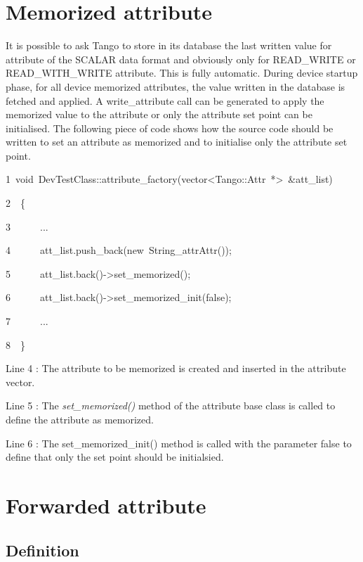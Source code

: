 \section{Memorized attribute}

It is possible to ask Tango to store in its database the last written
value for attribute of the SCALAR data format and obviously only for
READ\_WRITE or READ\_WITH\_WRITE attribute. This is fully automatic.
During device startup phase, for all device memorized
attributes, the value written in the database is fetched and applied.
A write\_attribute call can be generated to apply the memorized value
to the attribute or only the attribute set point can be initialised.
The following piece of code shows how the source code should be written
to set an attribute as memorized and to initialise only the attribute
set point.


\begin{lyxcode}
1~void~DevTestClass::attribute\_factory(vector<Tango::Attr~{*}>~\&att\_list)

2~~\{

3~~~~~~...

4~~~~~~att\_list.push\_back(new~String\_attrAttr());

5~~~~~~att\_list.back()->set\_memorized();

6~~~~~~att\_list.back()->set\_memorized\_init(false);

7~~~~~~...

8~~\}
\end{lyxcode}


Line 4 : The attribute to be memorized is created and inserted in
the attribute vector.

Line 5 : The \emph{set\_memorized()} method of the attribute base
class is called to define the attribute as memorized.

Line 6 : The set\_memorized\_init() method is called with the parameter
false to define that only the set point should be initialsied.


\section{Forwarded attribute}


\subsection{Definition}


